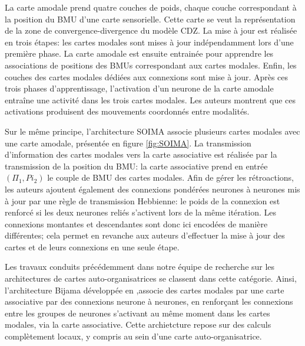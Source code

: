 \documentclass[../main]{subfiles}
\begin{document}
La carte amodale prend quatre couches de poids, chaque couche correspondant à la position du BMU d'une carte sensorielle. Cette carte se veut la représentation de la zone de convergence-divergence du modèle CDZ.
La mise à jour est réalisée en trois étapes: les cartes modales sont mises à jour indépendamment lors d'une première phase. La carte amodale est ensuite entrainée pour apprendre les associations de positions des BMUs correspondant aux cartes modales. Enfin, les couches des cartes modales dédiées aux connexions sont mise à jour.
Après ces trois phases d'apprentissage, l'activation d'un neurone de la carte amodale entraîne une activité dans les trois cartes modales. Les auteurs montrent que ces activations produisent des mouvements coordonnés entre modalités.

Sur le même principe, l'architecture SOIMA \cite{escobar-juarez_self-organized_2016} associe plusieurs cartes modales avec une carte amodale, présentée en figure \ref{fig:SOIMA}.
La transmission d'information des cartes modales vers la carte associative est réalisée par la transmission de la position du BMU: la carte associative prend en entrée $(\Pi_1,Pi_2)$ le couple de BMU des cartes modales. Afin de gérer les rétroactions, les auteurs ajoutent également des connexions pondérées neurones à neurones mis à jour par une règle de transmission Hebbienne: le poids de la connexion est renforcé si les deux neurones reliés s'activent lors de la même itération. Les connexions montantes et descendantes sont donc ici encodées de manière différentes; cela permet en revanche aux auteurs d'effectuer la mise à jour des cartes et de leurs connexions en une seule étape.

Les travaux conduits précédemment dans notre équipe de recherche sur les architectures de cartes auto-organisatrices se classent dans cette catégorie.
Ainsi, l'architecture Bijama développée en \cite{menard05,khouzam_2013},associe des cartes modales par une carte associative par des connexions neurone à neurones, en renforçant les connexions entre les groupes de neurones s'activant au même moment dans les cartes modales, via la carte associative. Cette archietcture repose sur des calculs complètement locaux, y compris au sein d'une carte auto-organisatrice.
\end{document}
